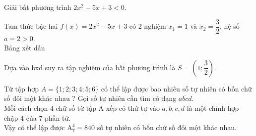 

\begin{bt}%
    Giải bất phương trình $2x^2-5x+3<0$.
    \loigiai
    {
        Tam thức bậc hai $ f(x)=2x^2-5x+3 $ có 2 nghiệm $ x_1=1 $ và $ x_2=\dfrac{3}{2} $, hệ số $ a=2>0 $.\\
        Bảng xét dấu
     \begin{center}
     \end{center}
        Dựa vào bxd suy ra tập nghiệm của bất phương trình là $ S= \left(1;\dfrac{3}{2}\right)$.
    }
\end{bt}
\begin{bt}%
    Từ tập hợp $A=\{1 ; 2 ; 3 ; 4 ; 5 ; 6\}$ có thể lập được bao nhiêu số tự nhiên có bốn chữ số đôi một khác nhau ?
    \loigiai
    {
        Gọi số tự nhiên cần tìm có dạng $ \overline{abcd} $.\\
        Mỗi cách chọn $ 4 $ chữ số từ tập A xếp có thứ tự vào $ a,b,c,d $ là một chỉnh hợp chập $ 4 $ của $ 7 $ phần tử.\\
        Vậy có thể lập được $ \mathrm{A}_7^4=840 $ số tự nhiên có bốn chứ số đôi một khác nhau.
    }
\end{bt}

